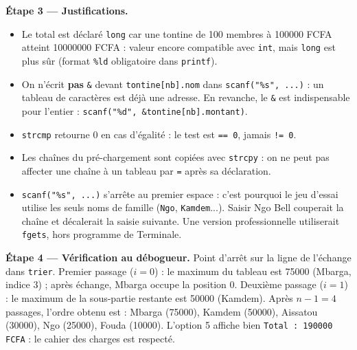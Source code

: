 \documentclass[11pt]{article}
\begin{document}
\begin{exoresolu}
\textbf{Étape 3 — Justifications.}
\begin{itemize}
  \item Le total est déclaré \texttt{long} car une tontine de 100 membres à \num{100000} FCFA atteint \num{10000000} FCFA : valeur encore compatible avec \texttt{int}, mais \texttt{long} est plus sûr (format \texttt{\%ld} obligatoire dans \texttt{printf}).
  \item On n'écrit \textbf{pas} \texttt{\&} devant \texttt{tontine[nb].nom} dans \texttt{scanf("\%s", ...)} : un tableau de caractères est déjà une adresse. En revanche, le \texttt{\&} est indispensable pour l'entier : \texttt{scanf("\%d", \&tontine[nb].montant)}.
  \item \texttt{strcmp} retourne 0 en cas d'égalité : le test est \texttt{== 0}, jamais \texttt{!= 0}.
  \item Les chaînes du pré-chargement sont copiées avec \texttt{strcpy} : on ne peut pas affecter une chaîne à un tableau par \texttt{=} après sa déclaration.
  \item \texttt{scanf("\%s", ...)} s'arrête au premier espace : c'est pourquoi le jeu d'essai utilise les seuls noms de famille (\texttt{Ngo}, \texttt{Kamdem}...). Saisir \og Ngo Bell \fg{} couperait la chaîne et décalerait la saisie suivante. Une version professionnelle utiliserait \texttt{fgets}, hors programme de Terminale.
\end{itemize}

\textbf{Étape 4 — Vérification au débogueur.} Point d'arrêt sur la ligne de l'échange dans \texttt{trier}. Premier passage ($i=0$) : le maximum du tableau est \num{75000} (Mbarga, indice 3) ; après échange, Mbarga occupe la position 0. Deuxième passage ($i=1$) : le maximum de la sous-partie restante est \num{50000} (Kamdem). Après $n-1 = 4$ passages, l'ordre obtenu est : Mbarga (\num{75000}), Kamdem (\num{50000}), Aissatou (\num{30000}), Ngo (\num{25000}), Fouda (\num{10000}). L'option 5 affiche bien \texttt{Total : 190000 FCFA} : le cahier des charges est respecté.
\end{exoresolu}
\end{document}
